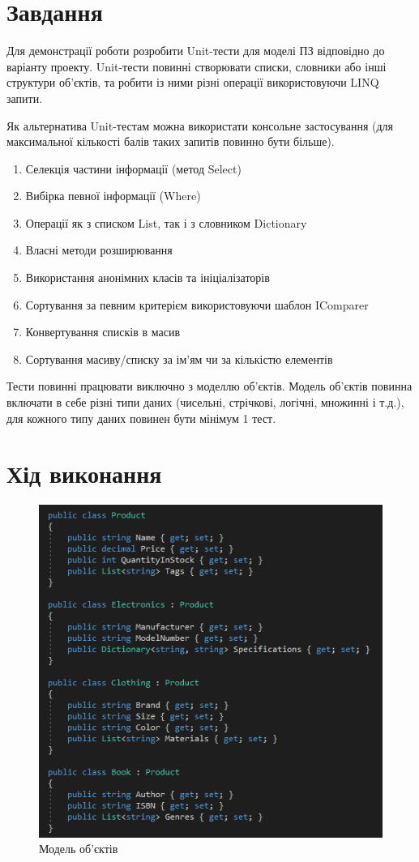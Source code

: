 \documentclass[oneside,14pt]{extarticle}
\begin{document}
\begin{normalsize}
	\section*{Завдання}
	Для демонстрації роботи розробити Unit-тести для моделі ПЗ відповідно до
	варіанту проекту. Unit-тести повинні створювати списки, словники або інші структури
	об’єктів, та робити із ними різні операції використовуючи LINQ запити.
	
	Як альтернатива Unit-тестам можна використати консольне застосування (для
	максимальної кількості балів таких запитів повинно бути більше).
	\begin{enumerate}
		\item Селекція частини інформації (метод Select)
		\item Вибірка певної інформації (Where)
		\item Операції як з списком List, так і з словником Dictionary
		\item Власні методи розширювання
		\item Використання анонімних класів та ініціалізаторів
		\item Сортування за певним критерієм використовуючи шаблон IComparer
		\item Конвертування списків в масив
		\item Сортування масиву/списку за ім’ям чи за кількістю елементів
	\end{enumerate}

Тести повинні працювати виключно з моделлю об’єктів. Модель об'єктів повинна
включати в себе різні типи даних (чисельні, стрічкові, логічні, множинні і т.д.), для
кожного типу даних повинен бути мінімум 1 тест.

	\section*{Хід виконання}
	\begin{figure}[H]
		\centering
		\includegraphics[width=\textwidth]{11}
		\caption{Модель об'єктів}
	\end{figure}


\end{normalsize}
\end{document}
